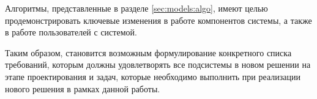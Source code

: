 	Алгоритмы, представленные в разделе \ref{sec:models:algo}, имеют целью продемонстрировать ключевые изменения в работе компонентов системы, а также в работе пользователей с системой.

	Таким образом, становится возможным формулирование конкретного списка требований, которым должны удовлетворять все подсистемы в новом решении на этапе проектирования и задач, которые необходимо выполнить при реализации нового решения в рамках данной работы.

